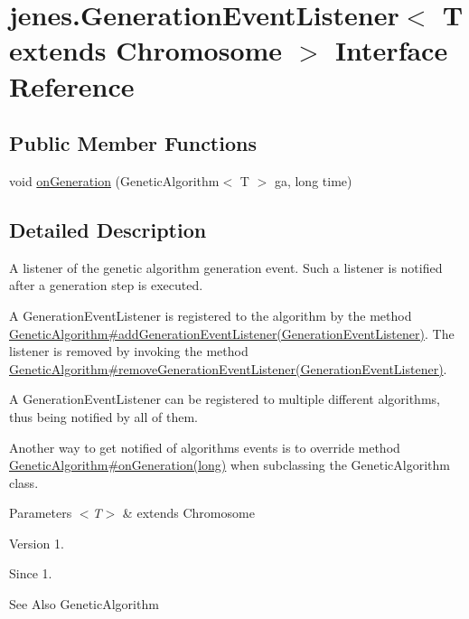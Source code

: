 \hypertarget{interfacejenes_1_1_generation_event_listener_3_01_t_01extends_01_chromosome_01_4}{\section{jenes.\-Generation\-Event\-Listener$<$ T extends Chromosome $>$ Interface Reference}
\label{interfacejenes_1_1_generation_event_listener_3_01_t_01extends_01_chromosome_01_4}
}
\subsection*{Public Member Functions}
\begin{DoxyCompactItemize}
\item 
void \hyperlink{interfacejenes_1_1_generation_event_listener_3_01_t_01extends_01_chromosome_01_4_aae224991bea21e4eca0f81ce0fb464e9}{on\-Generation} (Genetic\-Algorithm$<$ T $>$ ga, long time)
\end{DoxyCompactItemize}


\subsection{Detailed Description}
A listener of the genetic algorithm generation event. Such a listener is notified after a generation step is executed. 

A {\ttfamily Generation\-Event\-Listener} is registered to the algorithm by the method \hyperlink{}{Genetic\-Algorithm\#add\-Generation\-Event\-Listener(\-Generation\-Event\-Listener)}. The listener is removed by invoking the method \hyperlink{}{Genetic\-Algorithm\#remove\-Generation\-Event\-Listener(\-Generation\-Event\-Listener)}. 

A {\ttfamily Generation\-Event\-Listener} can be registered to multiple different algorithms, thus being notified by all of them. 

Another way to get notified of algorithms events is to override method \hyperlink{}{Genetic\-Algorithm\#on\-Generation(long)} when subclassing the {\ttfamily Genetic\-Algorithm} class. 


\begin{DoxyParams}{Parameters}
{\em $<$\-T$>$} & extends Chromosome\\
\hline
\end{DoxyParams}
\begin{DoxyVersion}{Version}
1. 
\end{DoxyVersion}
\begin{DoxySince}{Since}
1.
\end{DoxySince}
\begin{DoxySeeAlso}{See Also}
Genetic\-Algorithm 
\end{DoxySeeAlso}


